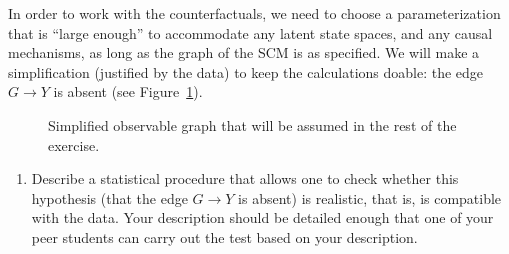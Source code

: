 In order to work with the counterfactuals, we need to choose a parameterization that is ``large enough'' to accommodate any latent state spaces, and any causal mechanisms, as long as the graph of the SCM is as specified.
We will make a simplification (justified by the data) to keep the calculations doable: the edge $G \to Y$ is absent (see Figure~\ref{fig:causal_graph_Berkeley_admission_data_simplified}).
\begin{figure}[ht]
\centering
{}
\caption{Simplified observable graph that will be assumed in the rest of the exercise.}
\label{fig:causal_graph_Berkeley_admission_data_simplified}
\end{figure}
\begin{enumerate}[resume*]
  \item Describe a statistical procedure that allows one to check whether this hypothesis (that the edge $G \to Y$ is absent) is realistic, that is, is compatible with the data. Your description should be detailed enough that one of your peer students can carry out the test based on your description. 
\end{enumerate}

